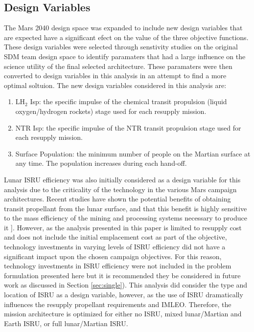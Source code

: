 \documentclass[]{aiaa-pretty}
\begin{document}
\subsection{Design Variables}
\label{sec:DVs}
The Mars 2040 design space was expanded to include new design variables that are expected have a significant efect on the value of the three objective functions. These design variables were selected through senstivity studies on the original SDM team design space to identify paramaters that had a large influence on the science utility of the final selected architecture. These paramaters were then converted to design variables in this analysis in an attempt to find a more optimal soltuion. The new design variables considered in this analysis are:
\begin{enumerate}
\item LH$_2$ Isp: the specific impulse of the chemical transit propulsion (liquid oxygen/hydrogen rockets) stage used for each resupply mission.
\item NTR Isp: the specific impulse of the NTR transit propulsion stage used for each resupply mission.
\item Surface Population: the minimum number of people on the Martian surface at any time. The population increases during each hand-off.
\end{enumerate} 
Lunar ISRU efficiency was also initially considered as a design variable for this analysis due to the criticality of the technology in the various Mars campaign architectures. Recent studies have shown the potential benefits of obtaining transit propellant from the lunar surface, and that this benefit is highly sensitive to the mass efficiency of the mining and processing systems necessary to produce it \cite{ho2014dynamic}]. However, as the analysis presented in this paper is limited to resupply cost and does not include the initial emplacement cost as part of the objective, technology investments in varying levels of ISRU efficiency did not have a significant impact upon the chosen campaign objectives. For this reason, technology investments in ISRU efficiency were not included in the problem formulation presented here but it is recommended they be considered in future work as discussed in Section \ref{sec:single}). This analysis did consider the type and location of ISRU as a design variable, however, as the use of ISRU dramatically influences the resupply propellant requirements and IMLEO. Therefore, the mission architecture is optimized for either no ISRU, mixed lunar/Martian and Earth ISRU, or full lunar/Martian ISRU.
\end{document}
